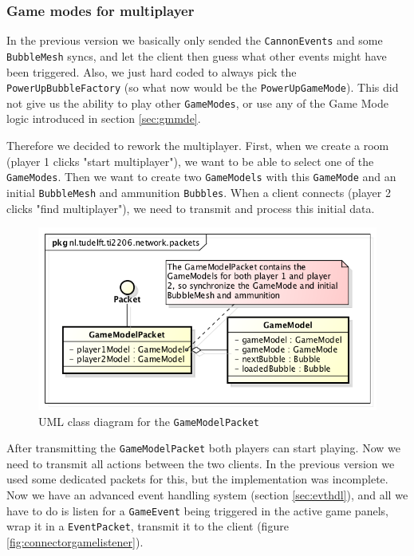 \documentclass[a4paper]{article}
\begin{document}
\subsubsection{Game modes for multiplayer}
In the previous version we basically only sended the \texttt{CannonEvents} and some \texttt{BubbleMesh} syncs, and let the client then guess what other events might have been triggered. Also, we just hard coded to always pick the \texttt{PowerUpBubbleFactory} (so what now would be the \texttt{PowerUpGameMode}). This did not give us the ability to play other \texttt{GameModes}, or use any of the Game Mode logic introduced in section \ref{sec:gmmde}.

\par{}Therefore we decided to rework the multiplayer. First, when we create a room (player 1 clicks "start multiplayer"), we want to be able to select one of the \texttt{GameModes}. Then we want to create two \texttt{GameModels} with this \texttt{GameMode} and an initial \texttt{BubbleMesh} and ammunition \texttt{Bubbles}. When a client connects (player 2 clicks "find multiplayer"), we need to transmit and process this initial data.

\begin{figure}[H]
	\centering
	\includegraphics[scale=0.5]{GameModelPacket.png}
    \caption{UML class diagram for the \texttt{GameModelPacket} }
    \label{fig:gmpacket}
\end{figure}

After transmitting the \texttt{GameModelPacket} both players can start playing. Now we need to transmit all actions between the two clients. In the previous version we used some dedicated packets for this, but the implementation was incomplete. Now we have an advanced event handling system (section \ref{sec:evthdl}), and all we have to do is listen for a \texttt{GameEvent} being triggered in the active game panels, wrap it in a \texttt{EventPacket}, transmit it to the client (figure \ref{fig:connectorgamelistener}).
\end{document}
